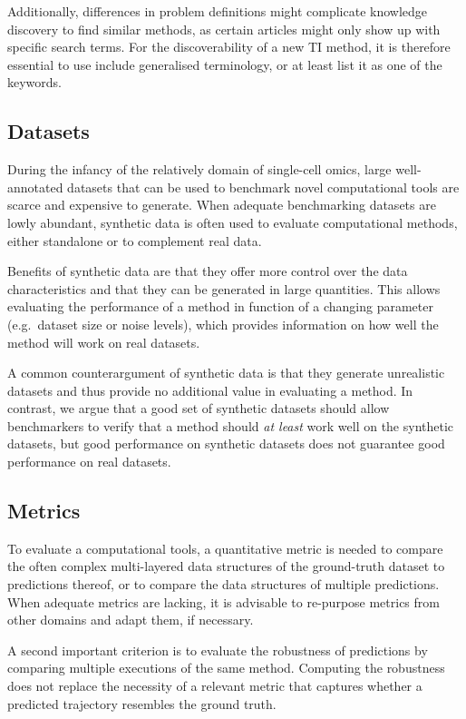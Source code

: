 Additionally, differences in problem definitions might complicate knowledge discovery to find similar methods, as certain articles might only show up with specific search terms. For the discoverability of a new TI method, it is therefore essential to use include generalised terminology, or at least list it as one of the keywords.

\subsection{Datasets} 
During the infancy of the relatively domain of single-cell omics, large well-annotated datasets that can be used to benchmark novel computational tools are scarce and expensive to generate.  When adequate benchmarking datasets are lowly abundant, synthetic data is often used to evaluate computational methods, either standalone or to complement real data. 

Benefits of synthetic data are that they offer more control over the data characteristics and that they can be generated in large quantities. This allows evaluating the performance of a method in function of a changing parameter (e.g.~dataset size or noise levels), which provides information on how well the method will work on real datasets.

A common counterargument of synthetic data is that they generate unrealistic datasets and thus provide no additional value in evaluating a method. In contrast, we argue that a good set of synthetic datasets should allow benchmarkers to verify that a method should \textit{at least} work well on the synthetic datasets, but good performance on synthetic datasets does not guarantee good performance on real datasets.

\subsection{Metrics}
To evaluate a computational tools, a quantitative metric is needed to compare  the often complex multi-layered data structures of the ground-truth dataset to predictions thereof, or to compare the data structures of multiple predictions. When adequate metrics are lacking, it is advisable to re-purpose metrics from other domains and adapt them, if necessary.

A second important criterion is to evaluate the robustness of predictions by comparing multiple executions of the same method. Computing the robustness does not replace the necessity of a relevant metric that captures whether a predicted trajectory resembles the ground truth.

